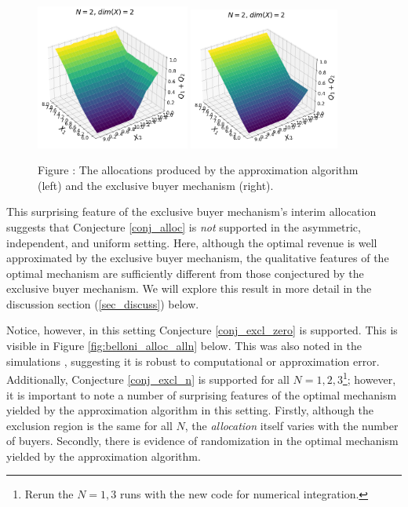 \begin{figure}[H]
    \begin{center}
    \includegraphics[width=0.45\textwidth]{images/asymmetric_independent_belloni.png}
    \includegraphics[width=0.44\textwidth]{images/asymmetric_independent_belloni_ebm.png}
    \end{center}
    
    \vspace{1mm}
    \raggedright{\small {\sc Figure \thefig\label{fig:belloni_alloc}:} The allocations produced by the approximation algorithm (left) and the exclusive buyer mechanism (right).} 
\end{figure}

\noindent This surprising feature of the exclusive buyer mechanism's interim allocation suggests that Conjecture \ref{conj_alloc} is \textit{not} supported in the asymmetric, independent, and uniform setting. Here, although the optimal revenue is well approximated by the exclusive buyer mechanism, the qualitative features of the optimal mechanism are sufficiently different from those conjectured by the exclusive buyer mechanism. We will explore this result in more detail in the discussion section (\ref{sec_discuss}) below.

Notice, however, in this setting Conjecture \ref{conj_excl_zero} is supported. This is visible in Figure \ref{fig:belloni_alloc_alln} below. This was also noted in the simulations \autocite{belloni2010multidimensional}, suggesting it is robust to computational or approximation error. Additionally, Conjecture \ref{conj_excl_n} is supported for all $N=1,2,3$\footnote{\color{red}Rerun the $N=1,3$ runs with the new code for numerical integration.}; however, it is important to note a number of surprising features of the optimal mechanism yielded by the approximation algorithm in this setting. Firstly, although the exclusion region is the same for all $N$, the \textit{allocation} itself varies with the number of buyers. Secondly, there is evidence of randomization in the optimal mechanism yielded by the approximation algorithm. 


